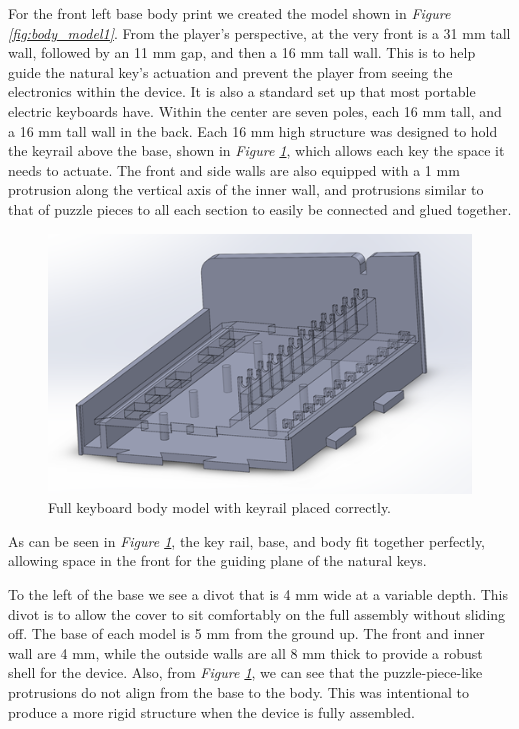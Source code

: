 For the front left base body print we created the model shown in \textit{Figure \ref{fig:body_model1}}. From the player’s perspective, at the very front is a 31 mm tall wall, followed by an 11 mm gap, and then a 16 mm tall wall. This is to help guide the natural key’s actuation and prevent the player from seeing the electronics within the device. It is also a standard set up that most portable electric keyboards have. Within the center are seven poles, each 16 mm tall, and a 16 mm tall wall in the back. Each 16 mm high structure was designed to hold the keyrail above the base, shown in \textit{Figure \ref{fig:body_model2}}, which allows each key the space it needs to actuate. The front and side walls are also equipped with a 1 mm protrusion along the vertical axis of the inner wall, and protrusions similar to that of puzzle pieces to all each section to easily be connected and glued together.

\begin{figure}[h!]
  \centering
  \includegraphics[width=0.8\linewidth]{image/BodyModel2.png}
  \caption{Full keyboard body model with keyrail placed correctly.}
  \label{fig:body_model2}
\end{figure}

As can be seen in \textit{Figure \ref{fig:body_model2}}, the key rail, base, and body fit together perfectly, allowing space in the front for the guiding plane of the natural keys.

To the left of the base we see a divot that is 4 mm wide at a variable depth. This divot is to allow the cover to sit comfortably on the full assembly without sliding off. The base of each model is 5 mm from the ground up. The front and inner wall are 4 mm, while the outside walls are all 8 mm thick to provide a robust shell for the device. Also, from \textit{Figure \ref{fig:body_model2}}, we can see that the puzzle-piece-like protrusions do not align from the base to the body. This was intentional to produce a more rigid structure when the device is fully assembled.

